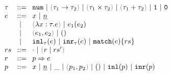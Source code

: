 \begin{figure}[t]
$\arraycolsep=4pt\begin{array}{lll}
\tau & ::= &
  \tnum ~\vert~
  \tarr{\tau_1}{\tau_2} ~\vert~
  \tprod{\tau_1}{\tau_2} ~\vert~
  \tsum{\tau_1}{\tau_2} ~\vert~
  \tunit ~\vert~
  \tvoid \\
e & ::= &
  x ~\vert~
  \hnum{n} \\
  & ~\vert~ &
  \hlam{x}{\tau}{e} ~\vert~
  \hap{e_1}{e_2} \\
  & ~\vert~ &
  \hpair{e_1}{e_2} ~\vert~
  \htriv \\
  & ~\vert~ &
  \hinl{\tau}{e} ~\vert~
  \hinr{\tau}{e} ~\vert~
  \hmatch{e}{rs} \\
rs & ::= &
  \cdot ~\vert~ \hrulesP{r}{rs'} \\
r & ::= &
  \hrul{p}{e} \\
p & ::= &
  x ~\vert~
  \hnum{n} ~\vert~
  \_ ~\vert~
  \hpair{p_1}{p_2} ~\vert~
  \htriv ~\vert~
  \hinlp{p} ~\vert~
  \hinrp{p}
\end{array}$
\end{figure}

